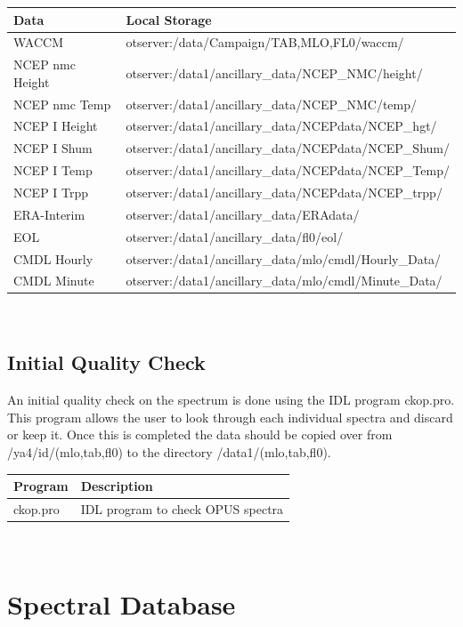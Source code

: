 \documentclass[12pt, letterpaper]{article}
\begin{document}
\begin{tabular}{ l l }
\textbf{Data} & \textbf{Local Storage} \\
\hline
WACCM               & otserver:/data/Campaign/TAB,MLO,FL0/waccm/             \\
NCEP nmc Height     & otserver:/data1/ancillary\_data/NCEP\_NMC/height/      \\
NCEP nmc Temp       & otserver:/data1/ancillary\_data/NCEP\_NMC/temp/        \\
NCEP I Height       & otserver:/data1/ancillary\_data/NCEPdata/NCEP\_hgt/    \\
NCEP I Shum         & otserver:/data1/ancillary\_data/NCEPdata/NCEP\_Shum/   \\
NCEP I Temp         & otserver:/data1/ancillary\_data/NCEPdata/NCEP\_Temp/   \\
NCEP I Trpp         & otserver:/data1/ancillary\_data/NCEPdata/NCEP\_trpp/   \\
ERA-Interim         & otserver:/data1/ancillary\_data/ERAdata/               \\
EOL                 & otserver:/data1/ancillary\_data/fl0/eol/               \\
CMDL Hourly         & otserver:/data1/ancillary\_data/mlo/cmdl/Hourly\_Data/ \\
CMDL Minute         & otserver:/data1/ancillary\_data/mlo/cmdl/Minute\_Data/ \\
\end{tabular} \\

\subsection{Initial Quality Check}
An initial quality check on the spectrum is done using the IDL program ckop.pro. This program allows the user to look through each individual spectra and discard or keep it. Once this is completed the data should be copied over from /ya4/id/(mlo,tab,fl0) to the directory /data1/(mlo,tab,fl0).\\

\begin{tabular}{ l l }
\textbf{Program} & \textbf{Description} \\
\hline
ckop.pro         & IDL program to check OPUS spectra \\
\end{tabular} \\

\section{Spectral Database}
\end{document}
